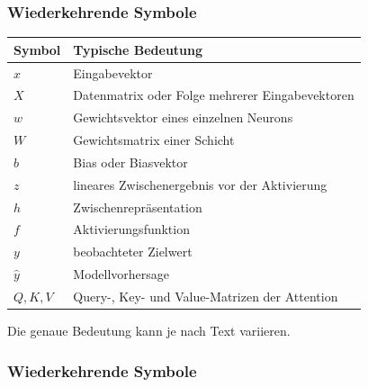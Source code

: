 \subsubsection{Wiederkehrende Symbole}

\par\addvspace{\medskipamount}
\noindent\begin{tabularx}{\linewidth}{@{}>{\raggedright\arraybackslash}p{}>{\raggedright\arraybackslash}X@{}}
\toprule
Symbol & Typische Bedeutung \\
\midrule
$x$ & Eingabevektor \\
$X$ & Datenmatrix oder Folge mehrerer Eingabevektoren \\
$w$ & Gewichtsvektor eines einzelnen Neurons \\
$W$ & Gewichtsmatrix einer Schicht \\
$b$ & Bias oder Biasvektor \\
$z$ & lineares Zwischenergebnis vor der Aktivierung \\
$h$ & Zwischenrepräsentation \\
$f$ & Aktivierungsfunktion \\
$y$ & beobachteter Zielwert \\
$\hat{y}$ & Modellvorhersage \\
$Q,K,V$ & Query-, Key- und Value-Matrizen der Attention \\
\bottomrule
\end{tabularx}
\par\addvspace{\medskipamount}

Die genaue Bedeutung kann je nach Text variieren.
\subsubsection{Wiederkehrende Symbole}

